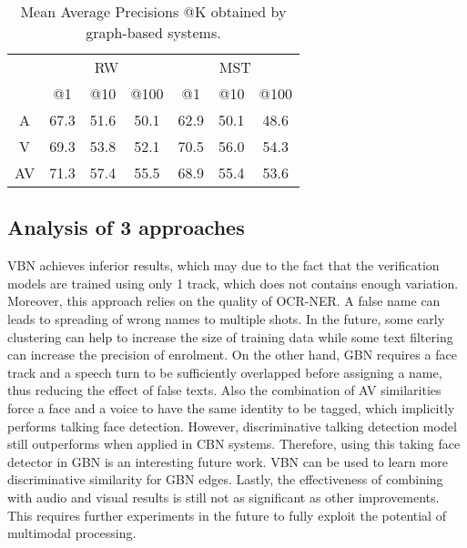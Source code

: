 \begin{table}[tb]
\label{tab:graph}
\centering
\vspace*{-5mm}
\caption{Mean Average Precisions @K obtained by graph-based systems.}
\vspace*{-2mm}
\begin{tabular}{c|c|c|c|| c|c|c|}
\cline{2-7}
  &  \multicolumn{3}{|c||}{RW} &  \multicolumn{3}{|c|}{MST} \\ \cline{2-7}
           & @1& @10& @100   & @1& @10& @100 \\ \hline
 \multicolumn{1}{|c|}{A} & 67.3 &  51.6 & 50.1  & 62.9 &  50.1 & 48.6\\ \hline
 \multicolumn{1}{|c|}{V} & 69.3  & 53.8 & 52.1 & 70.5  & 56.0 & 54.3\\ \hline
 \multicolumn{1}{|c|}{AV} & 71.3 &  57.4 & 55.5 &  68.9 &  55.4 & 53.6\\ \hline
\end{tabular}
\vspace*{-5mm}
\end{table}

\subsection{Analysis of 3 approaches}

VBN achieves inferior results, which may due to the fact that the verification models are trained using only 1 track, which does not contains enough variation. 
%
Moreover, this approach relies on the quality of OCR-NER. A false name can leads to spreading of wrong names to multiple shots. In the future, some early clustering can help to increase the size of training data while some text filtering can increase the precision of enrolment.
%
On the other hand, GBN requires a face track and a speech turn to be sufficiently overlapped before assigning a name, thus reducing the effect of false texts. Also the combination of AV similarities force a face and a voice to have the same identity to be tagged, which implicitly performs talking face detection.
%
However, discriminative talking detection model still outperforms when applied in CBN systems. Therefore, using this taking face detector in GBN is an interesting future work. 
%
VBN can be used to learn more discriminative similarity for GBN edges.
%
Lastly, the effectiveness of combining with audio and visual results is still not as significant as other improvements. This requires further experiments in the future to fully exploit the potential of multimodal processing.

